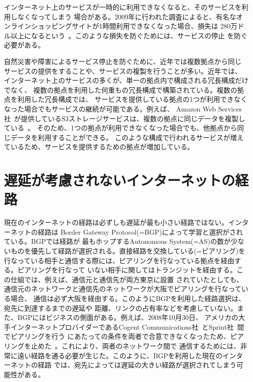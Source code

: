 インターネット上のサービスが一時的に利用できなくなると、そのサービスを利用しなくなってしまう
場合がある。2009年に行われた調査によると、有名なオンラインショッピングサイトが1時間利用できなくなった場合、損失は
280万ドル以上になるという~\cite{acm:sigops}。このような損失を防ぐためには、サービスの停止
を防ぐ必要がある。

自然災害や障害によるサービス停止を防ぐために、近年では複数拠点から同じ
サービスの提供をすることや、サービスの複製を行うことが多い。近年では、
インターネット上のサービスの多くが、単一の拠点内で構成される冗長構成だけでなく、
複数の拠点を利用した何重もの冗長構成で構築されている。複数の拠点を利用した冗長構成では、
サービスを提供している拠点の1つが利用できなくなった場合でもサービスの継続が可能である。例えば、
Amazon Web Services社~\cite{aws}が提供しているS3ストレージサービスは、複数の拠点に同じデータを複製している~\cite{awswhite}。
そのため、1つの拠点が利用できなくなった場合でも、他拠点から同じデータを利用することができる。
このような構成で行われるサービスが増えているため、サービスを提供するための拠点が増加している。

\section{遅延が考慮されないインターネットの経路}
\label{background:internetroute}

現在のインターネットの経路は必ずしも遅延が最も小さい経路ではない。インターネットの経路は
Border Gateway Protocol(=BGP)によって学習と選択がされている。BGPでは経路が
最もホップするAutonomous System(=AS)の数が少ないものを優先して経路が選択される。直接経路を交換している(=ピアリング)を
行なっている相手と通信する際には、ピアリングを行なっている拠点を経由する。ピアリングを行なって
いない相手に関してはトランジットを経由する。この仕組では、例えば、通信元と通信先が両方東京に設置
されていたとしても、通信元のネットワークと通信先のネットワークが大阪でピアリングを行なっている場合、
通信は必ず大阪を経由する。このようにBGPを利用した経路選択は、宛先に到達するまでの遅延や
距離、リンクの占有率などを考慮していない。また、BGPにはビジネスの側面がある。例えば、2008年10月30日、
アメリカの大手インターネットプロバイダーであるCogent Communications社~\cite{cogent}とSprint社~\cite{sprint}間でピアリングを行う
にあたっての条件を両者で合意できなくなったため、ピアリングを止めた~\cite{cogentpeering}。これにより、両者のネットワーク間で
通信するためには、非常に遠い経路を通る必要が生じた。このように、BGPを利用した現在のインターネットの経路
では、宛先によっては遅延の大きい経路が選択されてしまう可能性がある。

